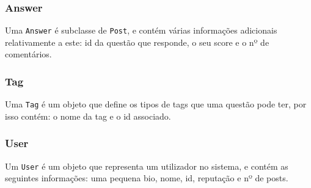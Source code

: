 \documentclass[a4paper]{article}
\begin{document}
		\subsubsection{Answer}
			\tab Uma \texttt{Answer} é subclasse de \texttt{Post}, e contém várias informações
			adicionais relativamente a este: id da questão que responde, o seu score e o nº
			de comentários.

		\subsubsection{Tag}
			\tab Uma \texttt{Tag} é um objeto que define os tipos de tags que uma questão
			pode ter, por isso contém: o nome da tag e o id associado.

		\subsubsection{User}
			\tab Um \texttt{User} é um objeto que representa um utilizador no sistema, e contém
			as seguintes informações: uma pequena bio, nome, id, reputação e nº de posts.
\end{document}
